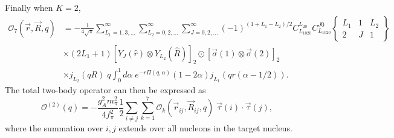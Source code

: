 \documentclass[12pt,letterpaper]{book}
\begin{document}
Finally when $K=2$,
\begin{equation}
\begin{split}
\mathcal{O}_7(\vec{r},\vec{R},q)&=-\frac{1}{4\sqrt{\pi}}\sum_{L_1=1,3,...}^{\infty}\sum_{L_2=0,2,...}^{\infty}\sum_{J=0,2,...}^{\infty}(-1)^{(1+L_1-L_2)/2}C_{L_1020}^{L_20}C_{L_1020}^{J0}\left\{\begin{array}{ccc}
L_1 & 1 & L_2\\
2 & J & 1
\end{array}\right\}\\
&\times (2L_1+1)\left[Y_J(\hat{r})\otimes Y_{L_2}(\hat{R})\right]_2\odot\left[\vec{\sigma}(1)\otimes\vec{\sigma}(2)\right]_2\\
&\times j_{L_2}(q R)\;q \int_0^1d\alpha\;e^{-r\Pi(q,\alpha)}(1-2\alpha)j_{L_1}(qr(\alpha-1/2)).
\end{split}
\end{equation}
The total two-body operator can then be expressed as 
\begin{equation}
\mathcal{O}^{(2)}(q)=-\frac{g_A^2m_{\pi}^2}{4f_{\pi}^2}\frac{1}{2}\sum_{i\neq j}\sum_{k=1}^7\mathcal{O}_k(\vec{r}_{ij},\vec{R}_{ij},q)\;\vec{\tau}(i)\cdot\vec{\tau}(j),
\end{equation}
where the summation over $i,j$ extends over all nucleons in the target nucleus.
\end{document}
